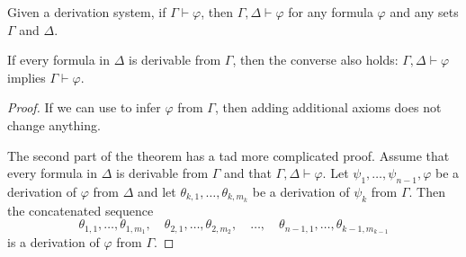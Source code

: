 \begin{proposition}\label{thm:derivation_system_transitivity}
  Given a derivation system, if \( \Gamma \vdash \varphi \), then \( \Gamma, \Delta \vdash \varphi \) for any formula \( \varphi \) and any sets \( \Gamma \) and \( \Delta \).

  If every formula in \( \Delta \) is derivable from \( \Gamma \), then the converse also holds: \( \Gamma, \Delta \vdash \varphi \) implies \( \Gamma \vdash \varphi \).
\end{proposition}
\begin{proof}
  If we can use  to infer \( \varphi \) from \( \Gamma \), then adding additional axioms does not change anything.

  The second part of the theorem has a tad more complicated proof. Assume that every formula in \( \Delta \) is derivable from \( \Gamma \) and that \( \Gamma, \Delta \vdash \varphi \). Let \( \psi_1, \ldots, \psi_{n-1}, \varphi \) be a derivation of \( \varphi \) from \( \Delta \) and let \( \theta_{k,1}, \ldots, \theta_{k,m_k} \) be a derivation of \( \psi_k \) from \( \Gamma \). Then the concatenated sequence
  \begin{equation*}
    \theta_{1,1}, \ldots, \theta_{1,m_1}, \quad \theta_{2,1}, \ldots, \theta_{2,m_2}, \quad \ldots, \quad \theta_{n-1,1}, \ldots, \theta_{k-1,m_{k-1}}
  \end{equation*}
  is a derivation of \( \varphi \) from \( \Gamma \).
\end{proof}

